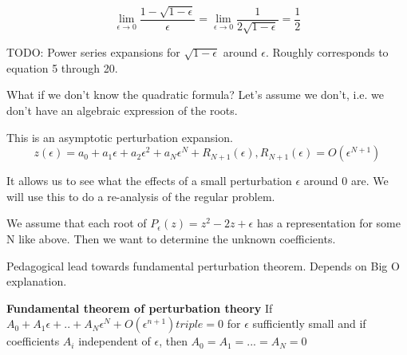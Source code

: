 \documentclass[12pt]{report}
\begin{document}
\begin{equation}
  \lim_{\epsilon \to 0} \frac{1 - \sqrt{1-\epsilon}}{\epsilon} =
  \lim_{\epsilon \to 0} \frac{1}{2\sqrt{1-\epsilon}} = \frac{1}{2}
\end{equation}

TODO: Power series expansions for $\sqrt{1-\epsilon}$ around
$\epsilon$. Roughly corresponds to equation 5 through 20.

What if we don't know the quadratic formula? Let's assume we don't,
i.e. we don't have an algebraic expression of the roots.

This is an asymptotic perturbation expansion.
\begin{equation}
  z(\epsilon) = a_0 + a_1\epsilon + a_2\epsilon^2 + a_N\epsilon^N +
  R_{N+1}(\epsilon), R_{N+1}(\epsilon) = O(\epsilon^{N+1})
\end{equation}

It allows us to see what the effects of a small perturbation
$\epsilon$ around 0 are. We will use this to do a re-analysis of the
regular problem.

We assume that each root of $P_\epsilon(z) = z^2 - 2z + \epsilon$ has
a representation for some N like above. Then we want to determine the
unknown coefficients.

Pedagogical lead towards fundamental perturbation theorem. Depends on Big O
explanation.

\textbf{Fundamental theorem of perturbation theory}
If $A_0 + A_1\epsilon + .. + A_N\epsilon^N + O(\epsilon^{n+1}) triple
= 0$ for $\epsilon$ sufficiently small and if coefficients $A_i$
independent of $\epsilon$, then $A_0=A_1=...=A_N=0$
\end{document}
